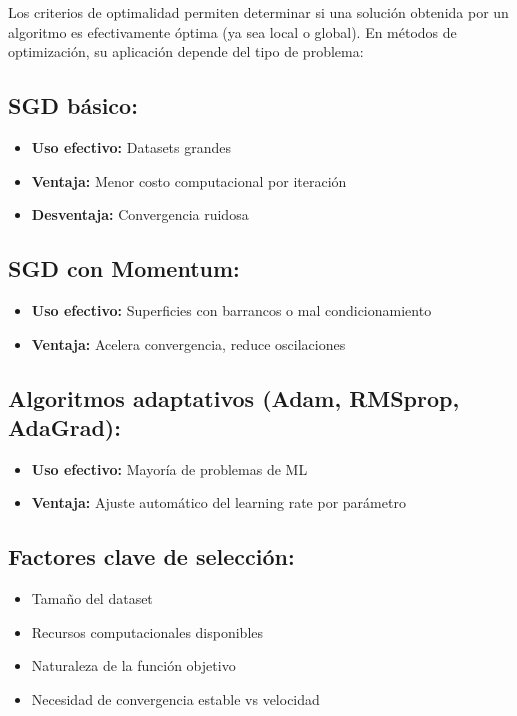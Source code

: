 \documentclass[12pt,a4paper]{article}
\begin{document}
Los criterios de optimalidad permiten determinar si una solución obtenida por un algoritmo es efectivamente óptima (ya sea local o global). En métodos de optimización, su aplicación depende del tipo de problema:

\subsection*{SGD básico:}
\begin{itemize}[leftmargin=1.5cm]
    \item \textbf{Uso efectivo:} Datasets grandes
    \item \textbf{Ventaja:} Menor costo computacional por iteración
    \item \textbf{Desventaja:} Convergencia ruidosa
\end{itemize}

\subsection*{SGD con Momentum:}
\begin{itemize}[leftmargin=1.5cm]
    \item \textbf{Uso efectivo:} Superficies con barrancos o mal condicionamiento
    \item \textbf{Ventaja:} Acelera convergencia, reduce oscilaciones
\end{itemize}

\subsection*{Algoritmos adaptativos (Adam, RMSprop, AdaGrad):}
\begin{itemize}[leftmargin=1.5cm]
    \item \textbf{Uso efectivo:} Mayoría de problemas de ML
    \item \textbf{Ventaja:} Ajuste automático del learning rate por parámetro
\end{itemize}

\subsection*{Factores clave de selección:}
\begin{itemize}[leftmargin=1.5cm]
    \item Tamaño del dataset
    \item Recursos computacionales disponibles
    \item Naturaleza de la función objetivo
    \item Necesidad de convergencia estable vs velocidad
\end{itemize}
\end{document}
